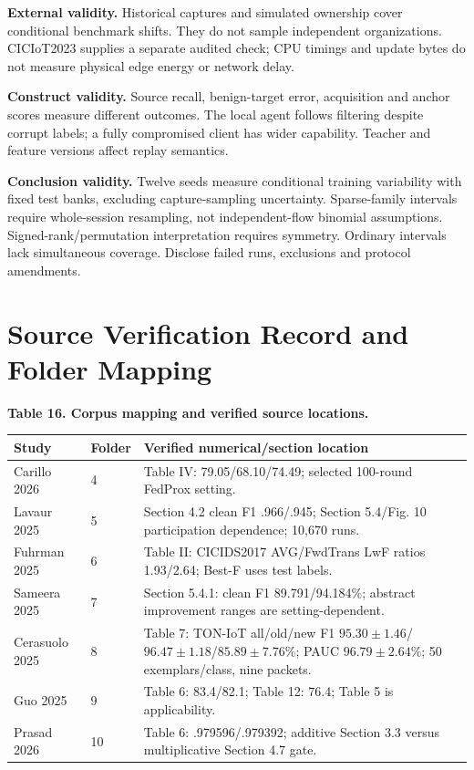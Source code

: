 \documentclass[10pt,a4paper]{article}
\begin{document}
\textbf{External validity.} Historical captures and simulated ownership cover conditional benchmark shifts. They do not sample independent organizations. CICIoT2023 supplies a separate audited check; CPU timings and update bytes do not measure physical edge energy or network delay.

\textbf{Construct validity.} Source recall, benign-target error, acquisition and anchor scores measure different outcomes. The local agent follows filtering despite corrupt labels; a fully compromised client has wider capability. Teacher and feature versions affect replay semantics.

\textbf{Conclusion validity.} Twelve seeds measure conditional training variability with fixed test banks, excluding capture-sampling uncertainty. Sparse-family intervals require whole-session resampling, not independent-flow binomial assumptions. Signed-rank/permutation interpretation requires symmetry. Ordinary intervals lack simultaneous coverage. Disclose failed runs, exclusions and protocol amendments.

\appendix
\section{Source Verification Record and Folder Mapping}


\centering\footnotesize
\par\textbf{Table 16. Corpus mapping and verified source locations.}\par


\begin{longtable}{p{2.4cm}p{1.0cm}l}
\toprule
Study & Folder & Verified numerical/section location\\
\midrule
Carillo 2026 & 4 & Table IV: 79.05/68.10/74.49; selected 100-round FedProx setting.\\
Lavaur 2025 & 5 & Section 4.2 clean F1 .966/.945; Section 5.4/Fig. 10 participation dependence; 10,670 runs.\\
Fuhrman 2025 & 6 & Table II: CICIDS2017 AVG/FwdTrans LwF ratios 1.93/2.64; Best-F uses test labels.\\
Sameera 2025 & 7 & Section 5.4.1: clean F1 89.791/94.184\%; abstract improvement ranges are setting-dependent.\\
Cerasuolo 2025 & 8 & Table 7: TON-IoT all/old/new F1 $95.30\pm1.46$/$96.47\pm1.18$/$85.89\pm7.76$\%; PAUC $96.79\pm2.64$\%; 50 exemplars/class, nine packets.\\
Guo 2025 & 9 & Table 6: 83.4/82.1; Table 12: 76.4; Table 5 is applicability.\\
Prasad 2026 & 10 & Table 6: .979596/.979392; additive Section 3.3 versus multiplicative Section 4.7 gate.\\
\bottomrule
\end{longtable}
\end{document}
